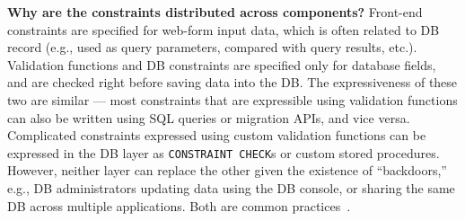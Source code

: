 \textbf{Why are the constraints distributed across components?}
Front-end constraints are specified for web-form input data,
which is often related to DB record (e.g., used
as query parameters, compared with query results, etc.).  
Validation functions and DB constraints are specified only for
database fields, and are checked right before 
saving data into the DB.
The expressiveness of these two are similar --- most
constraints that are expressible using validation functions can also be written using
SQL queries or migration APIs, and vice versa.
Complicated constraints expressed using custom validation functions can   be expressed in the DB layer as
{\tt CONSTRAINT CHECK}s or custom stored procedures. However, neither layer can replace the other given the existence of ``backdoors,'' e.g., DB administrators updating data using the DB console, or sharing the same DB across multiple applications. Both are common practices~\cite{discourse-import}.







